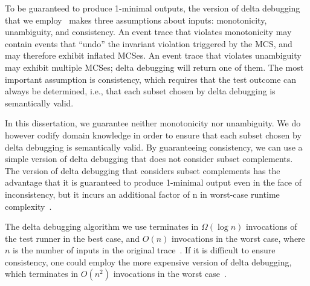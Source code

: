 To be guaranteed to produce 1-minimal outputs, the version of delta debugging that we employ~\cite{Zeller:1999:YMP:318773.318946}
makes three
assumptions about inputs: monotonicity, unambiguity, and consistency.
An event trace that violates monotonicity may contain events that ``undo'' the
invariant violation triggered by the MCS, and may therefore exhibit
inflated MCSes. An event trace that violates unambiguity may exhibit multiple MCSes; delta debugging
will return one of them. The most important assumption is consistency, which
requires that the test outcome can always be determined, i.e., that each
subset chosen by delta debugging is semantically valid.

In this dissertation, we guarantee neither monotonicity nor unambiguity. We do
however codify domain knowledge in order to ensure that each
subset chosen by delta debugging is semantically valid. By guaranteeing
consistency, we can use a simple version of delta debugging that does not
consider subset complements. The version of delta debugging that considers
subset complements has the advantage that it is guaranteed to produce
1-minimal output even in the face of inconsistency, but it incurs an additional factor of n in worst-case runtime
complexity~\cite{Zeller:2002:SIF:506201.506206}.

The delta debugging algorithm we use terminates in $\Omega(\log n)$
invocations of the test runner in the best case, and $O(n)$ invocations in the worst case, where $n$ is the number of inputs in the original
trace~\cite{Zeller:1999:YMP:318773.318946}. If it is difficult to ensure
consistency, one could employ the more expensive version of delta debugging,
which terminates in $O(n^2)$ invocations in the worst case~\cite{Zeller:2002:SIF:506201.506206}.


